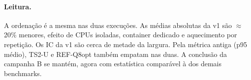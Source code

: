 \paragraph{Leitura.} A ordenação é a mesma nas duas execuções. As médias absolutas da v1 são $\approx$20\% menores, efeito de CPUs isoladas, container dedicado e aquecimento por repetição. Os IC da v1 são cerca de metade da largura. Pela métrica antiga (p95 médio), TS2-U e REF-Q8opt também empatam nas duas. A conclusão da campanha B se mantém, agora com estatística comparável à dos demais benchmarks.
